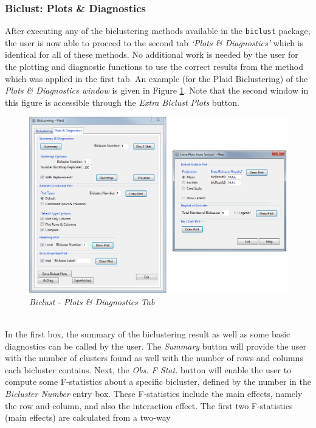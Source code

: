 \documentclass[a4paper]{article}\usepackage[]{graphicx}\usepackage[]{color}
\begin{document}
\subsubsection{Biclust: Plots \& Diagnostics}
After executing any of the biclustering methods available in the
\verb|biclust| package, the user is now able to proceed to the second tab {\it
`Plots \& Diagnostics'} which is identical for all of these methods.
No additional work is needed by the user for the plotting and diagnostic
functions to use the correct results from the method which was applied in the
first tab. An example (for the Plaid Biclustering) of the {\it Plots \&
Diagnostics window} is given in Figure \ref{biclust_plotdiagtab}.
Note that the second window in this figure is accessible through the {\it Extra
Biclust Plots} button.
\begin{figure}[H]
\centering
\includegraphics[scale=0.45]{figures/biclust_plotdiagtab.png}
\caption{{\it Biclust - Plots \& Diagnostics Tab}\label{biclust_plotdiagtab}}
\end{figure}
\\
\noindent In the first box, the summary of the biclustering result as well as
some basic diagnostics can be called by the user. The {\it Summary} button will
provide the user with the number of clusters found as well with the number of
rows and columns each bicluster contains. Next, the {\it Obs. F Stat.} button
will enable the user to compute some F-statistics about a specific bicluster,
defined by the number in the {\it Bicluster Number} entry box. These
F-statistics include the main effects, namely the row and column, and also the interaction
effect. The first two F-statistics (main effects) are calculated from a two-way
\end{document}
